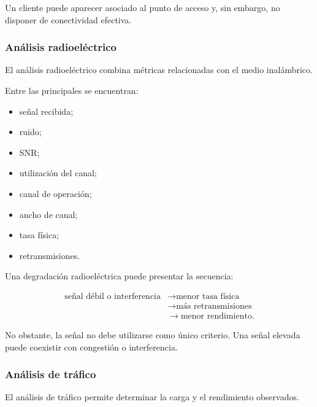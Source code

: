 Un cliente puede aparecer asociado al punto de acceso y, sin embargo, no
disponer de conectividad efectiva.


\subsubsection*{Análisis radioeléctrico}

El análisis radioeléctrico combina métricas relacionadas con el medio
inalámbrico.

Entre las principales se encuentran:

\begin{itemize}
    \item señal recibida;

    \item ruido;

    \item SNR;

    \item utilización del canal;

    \item canal de operación;

    \item ancho de canal;

    \item tasa física;

    \item retransmisiones.
\end{itemize}

Una degradación radioeléctrica puede presentar la secuencia:

\[
\begin{aligned}
    \text{señal débil o interferencia}
    &\longrightarrow
    \text{menor tasa física}\\
    &\longrightarrow
    \text{más retransmisiones}\\
    &\longrightarrow
    \text{menor rendimiento}.
\end{aligned}
\]

No obstante, la señal no debe utilizarse como único criterio. Una señal
elevada puede coexistir con congestión o interferencia.


\subsubsection*{Análisis de tráfico}

El análisis de tráfico permite determinar la carga y el rendimiento
observados.

